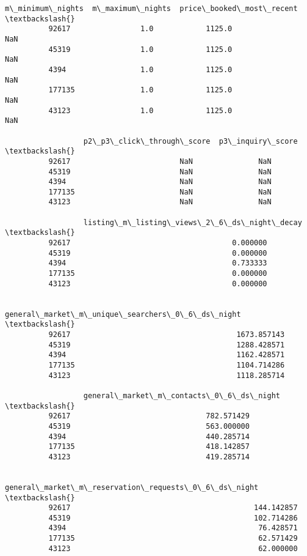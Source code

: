 \documentclass[11pt]{article}
\begin{document}
\begin{Verbatim}[commandchars=\\\{\}]
                  m\_minimum\_nights  m\_maximum\_nights  price\_booked\_most\_recent  \textbackslash{}
          92617                1.0            1125.0                       NaN   
          45319                1.0            1125.0                       NaN   
          4394                 1.0            1125.0                       NaN   
          177135               1.0            1125.0                       NaN   
          43123                1.0            1125.0                       NaN   
          
                  p2\_p3\_click\_through\_score  p3\_inquiry\_score  \textbackslash{}
          92617                         NaN               NaN   
          45319                         NaN               NaN   
          4394                          NaN               NaN   
          177135                        NaN               NaN   
          43123                         NaN               NaN   
          
                  listing\_m\_listing\_views\_2\_6\_ds\_night\_decay  \textbackslash{}
          92617                                     0.000000   
          45319                                     0.000000   
          4394                                      0.733333   
          177135                                    0.000000   
          43123                                     0.000000   
          
                  general\_market\_m\_unique\_searchers\_0\_6\_ds\_night  \textbackslash{}
          92617                                      1673.857143   
          45319                                      1288.428571   
          4394                                       1162.428571   
          177135                                     1104.714286   
          43123                                      1118.285714   
          
                  general\_market\_m\_contacts\_0\_6\_ds\_night  \textbackslash{}
          92617                               782.571429   
          45319                               563.000000   
          4394                                440.285714   
          177135                              418.142857   
          43123                               419.285714   
          
                  general\_market\_m\_reservation\_requests\_0\_6\_ds\_night  \textbackslash{}
          92617                                          144.142857    
          45319                                          102.714286    
          4394                                            76.428571    
          177135                                          62.571429    
          43123                                           62.000000    
          

\end{Verbatim}
\end{document}
